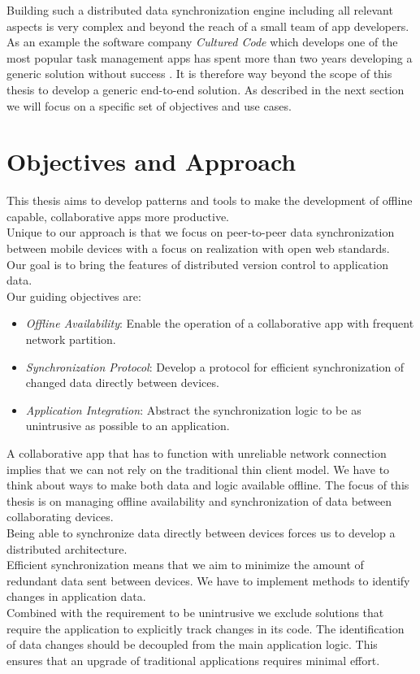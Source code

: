 Building such a distributed data synchronization engine including all relevant aspects is very complex and beyond the reach of a small team of app developers.
As an example the software company \emph{Cultured Code} which develops one of the most popular task management apps has spent more than two years developing a generic solution without success \cite{things}.
It is therefore way beyond the scope of this thesis to develop a generic end-to-end solution.
As described in the next section we will focus on a specific set of objectives and use cases.

\section{Objectives and Approach}

This thesis aims to develop patterns and tools to make the development of offline capable, collaborative apps more productive.\\
Unique to our approach is that we focus on peer-to-peer data synchronization between mobile devices with a focus on realization with open web standards.\\
Our goal is to bring the features of distributed version control to application data.\\

Our guiding objectives are:

\begin{itemize}
\item \emph{Offline Availability}: Enable the operation of a collaborative app with frequent network partition.
\item \emph{Synchronization Protocol}: Develop a protocol for efficient synchronization of changed data directly between devices.
\item \emph{Application Integration}: Abstract the synchronization logic to be as unintrusive as possible to an application.
\end{itemize}

A collaborative app that has to function with unreliable network connection implies that we can not rely on the traditional thin client model.
We have to think about ways to make both data and logic available offline.
The focus of this thesis is on managing offline availability and synchronization of data between collaborating devices.\\
Being able to synchronize data directly between devices forces us to develop a distributed architecture.\\
Efficient synchronization means that we aim to minimize the amount of redundant data sent between devices.
We have to implement methods to identify changes in application data.\\
Combined with the requirement to be unintrusive we exclude solutions that require the application to explicitly track changes in its code.
The identification of data changes should be decoupled from the main application logic.
This ensures that an upgrade of traditional applications requires minimal effort.\\

